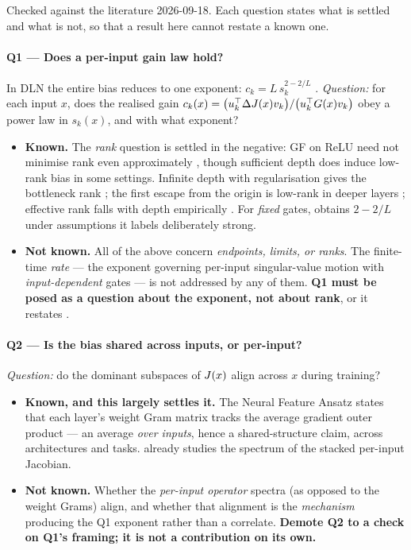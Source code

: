 \documentclass{article}
\newcommand{\NOTE}[1]{{\color{gray}\small #1}}
\theoremstyle{plain}\newtheorem{theorem}{Theorem}\newtheorem{lemma}[theorem]{Lemma}
\theoremstyle{definition}\newtheorem{definition}[theorem]{Definition}
\begin{document}
\NOTE{Checked against the literature 2026-09-18. Each question states what is settled and what is
not, so that a result here cannot restate a known one.}

\paragraph{Q1 --- Does a per-input gain law hold?}
In DLN the entire bias reduces to one exponent: $c_k=L\,s_k^{2-2/L}$ \cite{arora2018optimization}.
\emph{Question:} for each input $x$, does the realised gain
$c_k(x)=\big(u_k^\top\Delta J(x)v_k\big)/\big(u_k^\top G(x)v_k\big)$ obey a power law in
$s_k(x)$, and with what exponent?
\begin{itemize}[leftmargin=*,itemsep=0pt]
  \item \textbf{Known.} The \emph{rank} question is settled in the negative: GF on ReLU need not
        minimise rank even approximately \cite{timor2023implicit}, though sufficient depth does
        induce low-rank bias in some settings. Infinite depth with regularisation gives the
        bottleneck rank \cite{jacot2023implicit}; the first escape from the origin is low-rank in
        deeper layers \cite{bantzis2025saddle}; effective rank falls with depth empirically
        \cite{huh2021lowrank}. For \emph{fixed} gates, \cite{haas2026why} obtains $2-2/L$ under
        assumptions it labels deliberately strong.
  \item \textbf{Not known.} All of the above concern \emph{endpoints, limits, or ranks}. The
        finite-time \emph{rate} --- the exponent governing per-input singular-value motion with
        \emph{input-dependent} gates --- is not addressed by any of them. \textbf{Q1 must be posed
        as a question about the exponent, not about rank}, or it restates
        \cite{timor2023implicit}.
\end{itemize}

\paragraph{Q2 --- Is the bias shared across inputs, or per-input?}
\emph{Question:} do the dominant subspaces of $J(x)$ align across $x$ during training?
\begin{itemize}[leftmargin=*,itemsep=0pt]
  \item \textbf{Known, and this largely settles it.} The Neural Feature Ansatz
        \cite{radhakrishnan2024mechanism,beaglehole2024agop} states that each layer's weight Gram
        matrix tracks the average gradient outer product --- an average \emph{over inputs}, hence a
        shared-structure claim, across architectures and tasks.
        \cite{wang2016extended} already studies the spectrum of the stacked per-input Jacobian.
  \item \textbf{Not known.} Whether the \emph{per-input operator} spectra (as opposed to the
        weight Grams) align, and whether that alignment is the \emph{mechanism} producing the Q1
        exponent rather than a correlate. \textbf{Demote Q2 to a check on Q1's framing; it is not
        a contribution on its own.}
\end{itemize}
\end{document}

